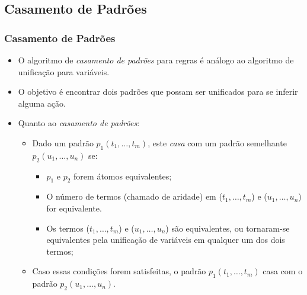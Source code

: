 \subsection{Casamento de Padrões}

\begin{frame}[fragile]
	\frametitle{Casamento de Padrões}
    
    \begin{itemize}
    	
        \item O algoritmo de {\em casamento de padrões} para regras é análogo ao algoritmo de    unificação para variáveis. 
        
        \item O objetivo é encontrar dois padrões que possam ser unificados para se inferir alguma ação.
        
        \item Quanto ao {\em casamento de padrões}:
        \framebreak
        
        \begin{itemize}
        	\item Dado um padrão $p_1(t_1, \ldots,t_m)$, este \emph{casa} 
        	com um padrão semelhante $p_2(u_1, \ldots,u_n)$ se:
            
            \begin{itemize}
            	\item $p_1$ e $p_2$ forem átomos equivalentes;
            
                \item O número de termos (chamado de aridade) em ($t_1, \ldots,t_m$)
                e ($u_1, \ldots,u_n$) for equivalente.
            
            	\item Os termos ($t_1, \ldots,t_m$) e ($u_1, \ldots,u_n$) são equivalentes, ou tornaram-se  equivalentes pela unificação de variáveis	em qualquer um dos dois termos;
            \end{itemize}
            
            \item Caso essas condições forem satisfeitas, o padrão $p_1(t_1,\ldots,t_m)$  casa com o padrão $p_2(u_1, \ldots,u_n)$.
            
        \end{itemize}        
        
    \end{itemize}
    
\end{frame}

